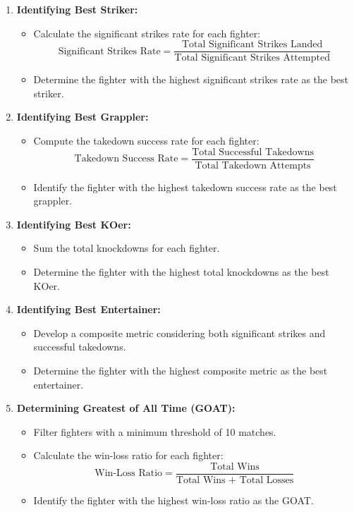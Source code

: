 \documentclass[
  man,floatsintext]{apa6}
\providecommand{\tightlist}{%
  \setlength{\itemsep}{0pt}\setlength{\parskip}{0pt}}
\begin{document}
\begin{enumerate}
\def\labelenumi{\arabic{enumi}.}
\tightlist
\item
  \textbf{Identifying Best Striker:}

  \begin{itemize}
  \tightlist
  \item
    Calculate the significant strikes rate for each fighter:
    \[ \text{Significant Strikes Rate} = \frac{\text{Total Significant Strikes Landed}}{\text{Total Significant Strikes Attempted}} \]
  \item
    Determine the fighter with the highest significant strikes rate as the best striker.
  \end{itemize}
\item
  \textbf{Identifying Best Grappler:}

  \begin{itemize}
  \tightlist
  \item
    Compute the takedown success rate for each fighter:
    \[ \text{Takedown Success Rate} = \frac{\text{Total Successful Takedowns}}{\text{Total Takedown Attempts}} \]
  \item
    Identify the fighter with the highest takedown success rate as the best grappler.
  \end{itemize}
\item
  \textbf{Identifying Best KOer:}

  \begin{itemize}
  \tightlist
  \item
    Sum the total knockdowns for each fighter.
  \item
    Determine the fighter with the highest total knockdowns as the best KOer.
  \end{itemize}
\item
  \textbf{Identifying Best Entertainer:}

  \begin{itemize}
  \tightlist
  \item
    Develop a composite metric considering both significant strikes and successful takedowns.
  \item
    Determine the fighter with the highest composite metric as the best entertainer.
  \end{itemize}
\item
  \textbf{Determining Greatest of All Time (GOAT):}

  \begin{itemize}
  \tightlist
  \item
    Filter fighters with a minimum threshold of 10 matches.
  \item
    Calculate the win-loss ratio for each fighter:
    \[ \text{Win-Loss Ratio} = \frac{\text{Total Wins}}{\text{Total Wins + Total Losses}} \]
  \item
    Identify the fighter with the highest win-loss ratio as the GOAT.
  \end{itemize}
\end{enumerate}
\end{document}
